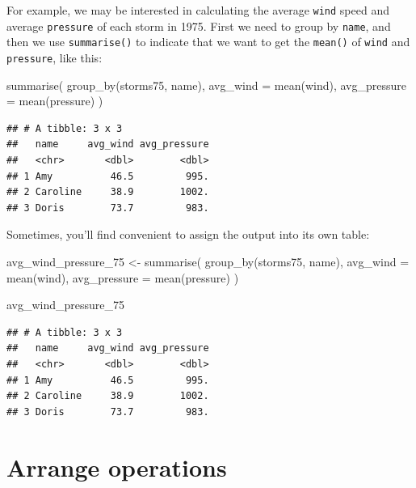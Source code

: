\documentclass[
]{book}
\newenvironment{Shaded}{\begin{snugshade}}{\end{snugshade}}
\newcommand{\AttributeTok}[1]{\textcolor[rgb]{0.77,0.63,0.00}{#1}}
\newcommand{\FunctionTok}[1]{\textcolor[rgb]{0.00,0.00,0.00}{#1}}
\newcommand{\NormalTok}[1]{#1}
\newcommand{\OtherTok}[1]{\textcolor[rgb]{0.56,0.35,0.01}{#1}}
\begin{document}
For example, we may be interested in calculating the average \texttt{wind} speed and
average \texttt{pressure} of each storm in 1975. First we need to group by \texttt{name},
and then we use \texttt{summarise()} to indicate that we want to get the \texttt{mean()}
of \texttt{wind} and \texttt{pressure}, like this:

\begin{Shaded}
\begin{Highlighting}[]
\FunctionTok{summarise}\NormalTok{(}
  \FunctionTok{group\_by}\NormalTok{(storms75, name),}
  \AttributeTok{avg\_wind =} \FunctionTok{mean}\NormalTok{(wind),}
  \AttributeTok{avg\_pressure =} \FunctionTok{mean}\NormalTok{(pressure)}
\NormalTok{)}
\end{Highlighting}
\end{Shaded}

\begin{verbatim}
## # A tibble: 3 x 3
##   name     avg_wind avg_pressure
##   <chr>       <dbl>        <dbl>
## 1 Amy          46.5         995.
## 2 Caroline     38.9        1002.
## 3 Doris        73.7         983.
\end{verbatim}

Sometimes, you'll find convenient to assign the output into its own table:

\begin{Shaded}
\begin{Highlighting}[]
\NormalTok{avg\_wind\_pressure\_75 }\OtherTok{\textless{}{-}} \FunctionTok{summarise}\NormalTok{(}
  \FunctionTok{group\_by}\NormalTok{(storms75, name),}
  \AttributeTok{avg\_wind =} \FunctionTok{mean}\NormalTok{(wind),}
  \AttributeTok{avg\_pressure =} \FunctionTok{mean}\NormalTok{(pressure)}
\NormalTok{)}

\NormalTok{avg\_wind\_pressure\_75}
\end{Highlighting}
\end{Shaded}

\begin{verbatim}
## # A tibble: 3 x 3
##   name     avg_wind avg_pressure
##   <chr>       <dbl>        <dbl>
## 1 Amy          46.5         995.
## 2 Caroline     38.9        1002.
## 3 Doris        73.7         983.
\end{verbatim}

\hypertarget{arrange-operations}{%
\section{Arrange operations}\label{arrange-operations}}
\end{document}
